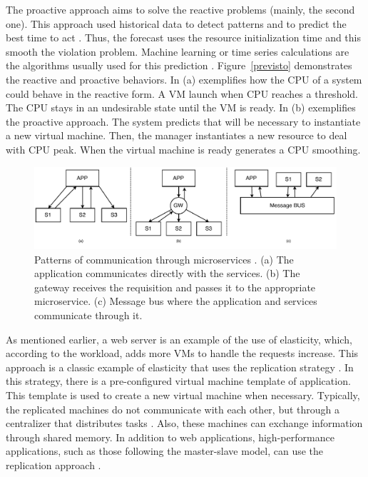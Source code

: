 The proactive approach aims to solve the reactive problems (mainly, the second one). This approach used historical data to detect patterns and to predict the best time to act \cite{Righi2013ElasticidadeDesafios}. Thus, the forecast uses the resource initialization time and this smooth the violation problem. Machine learning or time series calculations are the algorithms usually used for this prediction \cite{Rosa2014AnMechanisms, Gong2010PRESS:Systems, Loff2014Vadara:Applications, Roy2011EfficientForecasting, Moore2013TransformingAuto-scaling, Barrett2013ApplyingCloud, Nikravesh2017AnProvisioning}. Figure~\ref{previsto} demonstrates the reactive and proactive behaviors. In (a) exemplifies how the CPU of a system could behave in the reactive form. A VM launch when CPU reaches a threshold. The CPU stays in an undesirable state until the VM is ready. In (b) exemplifies the proactive approach. The system predicts that will be necessary to instantiate a new virtual machine. Then, the manager instantiates a new resource to deal with CPU peak. When the virtual machine is ready generates a CPU smoothing. 

\begin{figure}[th]
\centering
\includegraphics[scale=0.8]{Images/Microservices_comm.pdf}
\caption{Patterns of communication through microservices \cite{Namiot2014OnArchitecture}. (a) The application communicates directly with the services. (b) The gateway receives the requisition and passes it to the appropriate microservice. (c) Message bus where the application and services communicate through it.}
\label{microcomm}
\end{figure}

As mentioned earlier, a web server is an example of the use of elasticity, which, according to the workload, adds more VMs to handle the requests increase. This approach is a classic example of elasticity that uses the replication strategy \cite{Righi2013ElasticidadeDesafios}. In this strategy, there is a pre-configured virtual machine template of application. This template is used to create a new virtual machine when necessary. Typically, the replicated machines do not communicate with each other, but through a centralizer that distributes tasks \cite{Righi2013ElasticidadeDesafios}. Also, these machines can exchange information through shared memory. In addition to web applications, high-performance applications, such as those following the master-slave model, can use the replication approach \cite{Righi2013ElasticidadeDesafios}.

